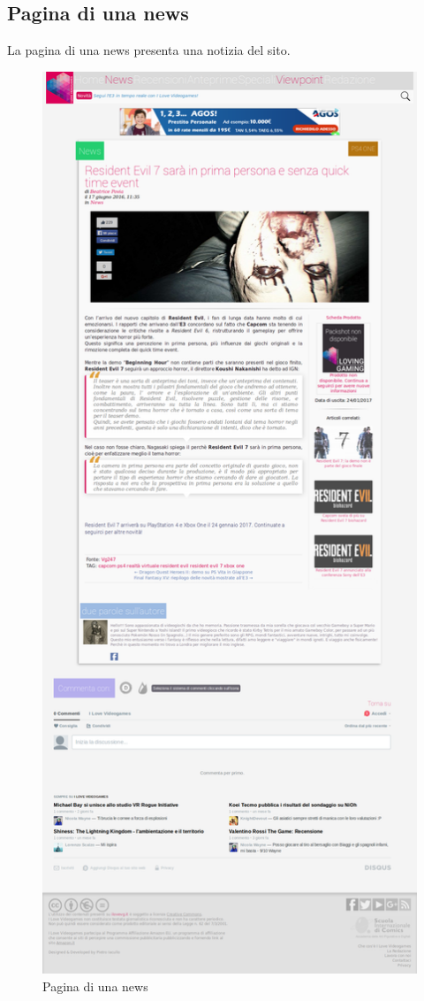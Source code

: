 \documentclass[../ProgettoTecWeb2.tex]{subfiles}
\begin{document}
	\subsection{Pagina di una news}
	La pagina di una news presenta una notizia del sito.
	\begin{figure} [H]
			\centering
			\includegraphics[scale=0.16]{img/NewsSingolaCompleta}
			\caption{Pagina di una news}
	\end{figure}
\end{document}
